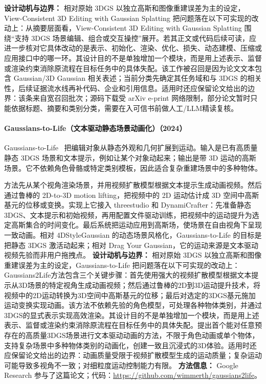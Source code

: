 \textbf{设计动机与边界：} 相对原始 3DGS 以独立高斯和图像重建误差为主的设定，View-Consistent 3D Editing with Gaussian Splatting 把问题落在以下可实现的改动上：从摘要层面看，View-Consistent 3D Editing with Gaussian Splatting 围绕“支持 3DGS 场景编辑、组合或交互操控”展开。若其正文或代码后续可读，应进一步核对它具体改动的是表示、初始化、渲染、优化、损失、动态建模、压缩或应用接口中的哪一环。其设计目的不是单独增加一个模块，而是用上述表示、监督或渲染约束消除原流程在目标任务中的具体失配。该工作被召回是因为论文文本包含 Gaussian/3D Gaussian 相关表述；当前分类先确定其任务域和与 3DGS 的相关性，后续证据流水线再补代码、企业和引用信息。适用时还应保留论文给出的边界：该条来自宽召回批次；源码下载受 arXiv e-print 网络限制，部分论文暂时只能依据标题、摘要和类别分类，需要在入可信书前做人工/LLM精读复核。
\paragraph{Gaussians-to-Life（文本驱动静态场景动画化）（2024）}
Gaussians-to-Life~\cite{2411_19233} 把编辑对象从静态外观和几何扩展到运动。输入是已有高质量静态 3DGS 场景和文本提示，例如让某个对象动起来；输出是带 3D 运动的高斯场景。它不依赖角色骨骼或特定类别模板，因此适合复杂重建场景中的多种物体。

方法先从某个视角渲染场景，并用视频扩散模型根据文本提示生成动画视频。然后通过鲁棒的 2D-to-3D motion lifting，把视频中的 2D 运动估计成 3D 空间中高斯基元的位移或变换。实现上它接入 threestudio 和 DynamiCrafter：先准备静态 3DGS、文本提示和初始视频，再用配置文件驱动训练，把视频中的运动提升为选定高斯集合的时间变化。最后系统把运动应用到高斯场，使场景在自由视角下呈现一致动画。相对 4DStyleGaussian 的动态场景风格化，Gaussians-to-Life 的目标是把静态 3DGS 激活动起来；相对 Drag Your Gaussian，它的运动来源是文本驱动视频先验而非用户拖拽点。
\textbf{设计动机与边界：} 相对原始 3DGS 以独立高斯和图像重建误差为主的设定，Gaussians-to-Life 把问题落在以下可实现的改动上：Gaussians2Life方法包含三个关键步骤：首先使用强大的视频扩散模型根据文本提示从3D场景的特定视角生成动画视频；然后通过鲁棒的2D到3D运动提升技术，将视频中的2D运动转换为3D空间中高斯基元的位移；最后对选定的3DGS基元施加运动变换实现动画。该方法不依赖先验的角色模型，可处理各种物体类别，并通过3DGS的显式表示实现高效渲染。其设计目的不是单独增加一个模块，而是用上述表示、监督或渲染约束消除原流程在目标任务中的具体失配。提出首个能对任意预存在的高质量3DGS场景进行文本驱动动画的方法，不限于角色动画或单个物体，支持复杂场景中多种物体类别的动画化，创建一致且沉浸式的3D体验。适用时还应保留论文给出的边界：动画质量受限于视频扩散模型生成的运动质量；复杂运动可能导致多视角不一致；对细粒度运动控制能力有限。
\textbf{方法信息：} Google Research 参与了这篇论文；代码：\url{https://github.com/wimmerth/gaussians2life}。

